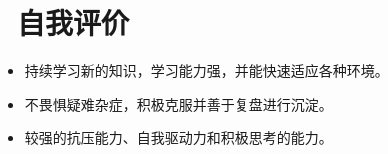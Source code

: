 \documentclass{resume}
\begin{document}





\section{\faHeartO\ 自我评价}
\begin{itemize}[itemsep=0.2em]
  \item 持续学习新的知识，学习能力强，并能快速适应各种环境。
  \item 不畏惧疑难杂症，积极克服并善于复盘进行沉淀。
  \item 较强的抗压能力、自我驱动力和积极思考的能力。
\end{itemize}


%
%
\end{document}
